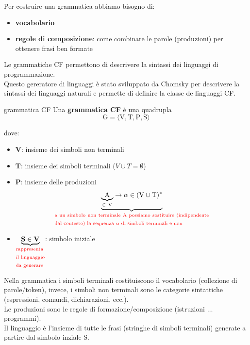 Per costruire una grammatica abbiamo bisogno di:
\begin{itemize}[label=$\circ$, itemsep=\smallskipamount]
    \item \textbf{vocabolario}
    \item \textbf{regole di composizione}: come combinare le parole (produzioni) per ottenere frasi ben formate
\end{itemize}

\bigskip
Le grammatiche CF permettono di descrivere la sintassi dei linguaggi di programmazione.\\[0.2ex]
Questo gereratore di linguaggi è stato sviluppato da Chomsky per descrivere la sintassi dei linguaggi naturali e permette di definire la classe de linguaggi CF.

\begin{mydef}{grammatica CF}
    Una \textbf{grammatica CF} è una quadrupla
    \[
        \mathrm{G = \langle V, T, P, S \rangle}
    \]

    dove:
    \begin{itemize}[label=$\diamond$, itemsep=\smallskipamount]
        \item \textbf{V}: insieme dei simboli non terminali
        \item \textbf{T}: insieme dei simboli terminali ($V \cup T = \emptyset$)
        \item \textbf{P}: insieme delle produzioni
        \[
            \underbrace{\underbrace{\mathrm{A}}_{\mathrm{\in \ V}} \rightarrow \alpha \in (\mathrm{V \cup T})^*}_{\text{\parbox{8cm}{\textcolor{red}{a un simbolo non terminale A possiamo sostituire (indipendente dal contesto) la sequenza $\alpha$ di simboli terminali e non}}}}
        \]
        \item $\underbrace{\mathbf{S \in V}}_{\text{\parbox{1.5cm}{\textcolor{red}{rappresenta il linguaggio da generare}}}}$: simbolo iniziale
    \end{itemize}
\end{mydef}

Nella grammatica i simboli terminali costituiscono il vocabolario (collezione di parole/token), invece, i simboli non terminali sono le categorie sintattiche (espressioni, comandi, dichiarazioni, ecc.).\\[0.2ex]
Le produzioni sono le regole di formazione/composizione (istruzioni $\dots$ programmi).\\[0.2ex]
Il linguaggio è l'insieme di tutte le frasi (stringhe di simboli terminali) generate a partire dal simbolo inziale $\mathrm{S}$.

